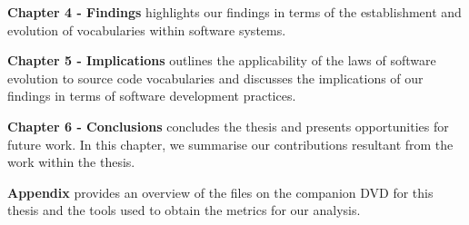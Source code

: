 \textbf{Chapter 4 - Findings} highlights our findings in terms of the establishment and evolution of vocabularies within software systems.

\textbf{Chapter 5 - Implications} outlines the applicability of the laws of software evolution to source code vocabularies and discusses the implications of our findings in terms of software development practices.

\textbf{Chapter 6 - Conclusions} concludes the thesis and presents opportunities for future work. In this chapter, we summarise our contributions resultant from the work within the thesis.

\textbf{Appendix} provides an overview of the files on the companion DVD for this thesis and the tools used to obtain the metrics for our analysis.



